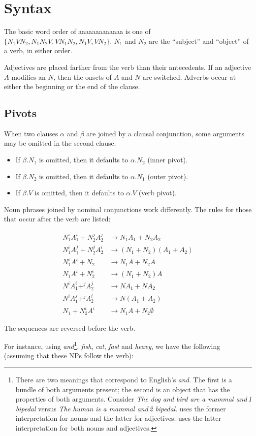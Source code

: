 \documentclass{book}
\newcommand{\lname}{aaaaaaaaaaaaa}
\begin{document}
\chapter{Syntax}

The basic word order of \lname{} is one of $\{N_1VN_2, N_1N_2V, VN_1N_2, N_1V, VN_2\}$. $N_1$ and $N_2$ are the ``subject'' and ``object'' of a verb, in either order.

Adjectives are placed farther from the verb than their antecedents. If an adjective $A$ modifies an $N$, then the onsets of $A$ and $N$ are switched. Adverbs occur at either the beginning or the end of the clause.

\section{Pivots}

When two clauses $\alpha$ and $\beta$ are joined by a clausal conjunction, some arguments may be omitted in the second clause.

\begin{itemize}
  \item If $\beta.N_1$ is omitted, then it defaults to $\alpha.N_2$ (inner pivot).
  \item If $\beta.N_2$ is omitted, then it defaults to $\alpha.N_1$ (outer pivot).
  \item If $\beta.V$ is omitted, then it defaults to $\alpha.V$ (verb pivot).
\end{itemize}

Noun phrases joined by nominal conjunctions work differently. The rules for those that occur after the verb are listed:

\begin{align}
  N_1^i A_1^i + N_2^j A_2^j &\rightarrow N_1 A_1 + N_2 A_2 \\
  N_1^i A_1^j + N_2^j A_2^i &\rightarrow (N_1 + N_2) (A_1 + A_2) \\
  N_1^i A^i + N_2 &\rightarrow N_1 A + N_2 A \\
  N_1 A^i + N_2^i &\rightarrow (N_1 + N_2) A \\
  N^i A_1^i +^j A_2^j &\rightarrow N A_1 + N A_2 \\
  N^i A_1^j +^j A_2^i &\rightarrow N (A_1 + A_2) \\
  N_1 + N_2^i A^i &\rightarrow N_1 A + N_2 \emptyset
\end{align}

The sequences are reversed before the verb.

For instance, using  \emph{and}\footnote{There are two meanings that correspond to English's \emph{and}. The first is a bundle of both arguments present; the second is an object that has the properties of both arguments. Consider \emph{The dog and bird are a mammal and\,1 bipedal} versus \emph{The human is a mammal and\,2 bipedal}.  uses the former interpretation for nouns and the latter for adjectives.  uses the latter interpretation for both nouns and adjectives.},  \emph{fish},  \emph{cat},  \emph{fast} and  \emph{heavy}, we have the following (assuming that these NPs follow the verb):
\end{document}
